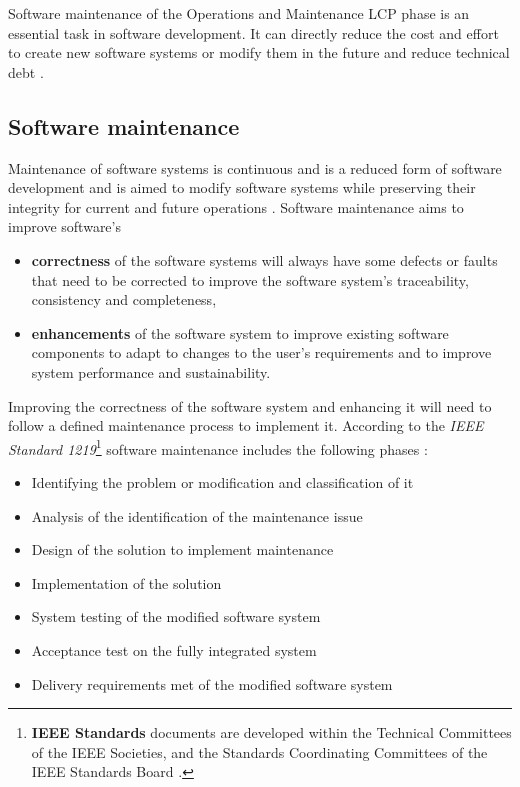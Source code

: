 Software maintenance of the Operations and Maintenance LCP phase is an essential task in software development. It can directly reduce the cost and effort to create new software systems or modify them in the future and reduce technical debt \cite{Thamburaj2017, DeLeon-Sigg2020}. 

\clearpage

\subsection{Software maintenance}\label{sec:ch1_softwareMaintenanceIntro}{}
Maintenance of software systems is continuous and is a reduced form of software development and is aimed to modify software systems while preserving their integrity for current and future operations \cite{Sneed2004, Ackermann2009, Port2017}. Software maintenance aims to improve software's \cite{Mamone1994}

\begin{itemize}
	\item \textbf{correctness} of the software systems will always have some defects or faults that need to be corrected to improve the software system's traceability, consistency and completeness,
	\item \textbf{enhancements} of the software system to improve existing software components to adapt to changes to the user's requirements and to improve system performance and sustainability. 
\end{itemize}

Improving the correctness of the software system and enhancing it will need to follow a defined maintenance process to implement it. According to the \textit{IEEE Standard 1219}\footnote{\textbf{IEEE Standards} documents are developed within the Technical Committees of the IEEE Societies, and the Standards Coordinating Committees of the IEEE Standards Board \cite{Mamone1994}.} software maintenance includes the following phases \cite{Mamone1994, Hasan2012}:
\begin{itemize}
	\item Identifying the problem or modification and classification of it
	\item Analysis of the identification of the maintenance issue
	\item Design of the solution to implement maintenance
	\item Implementation of the solution
	\item System testing of the modified software system
	\item Acceptance test on the fully integrated system
	\item Delivery requirements met of the modified software system
\end{itemize}

